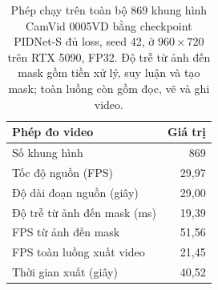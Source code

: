 \begin{table}[htbp]
\centering\small
\begin{tabularx}{\linewidth}{@{}Xr@{}}
\toprule
Phép đo video & Giá trị\\
\midrule
Số khung hình & 869\\
Tốc độ nguồn (FPS) & 29,97\\
Độ dài đoạn nguồn (giây) & 29,00\\
Độ trễ từ ảnh đến mask (ms) & 19,39\\
FPS từ ảnh đến mask & 51,56\\
FPS toàn luồng xuất video & 21,45\\
Thời gian xuất (giây) & 40,52\\
\bottomrule
\end{tabularx}
\caption{Phép chạy trên toàn bộ 869 khung hình CamVid 0005VD bằng checkpoint PIDNet-S đủ loss, seed 42, ở $960\times720$ trên RTX 5090, FP32. Độ trễ từ ảnh đến mask gồm tiền xử lý, suy luận và tạo mask; toàn luồng còn gồm đọc, vẽ và ghi video.}
\label{tab:a2-video-timing}
\end{table}
